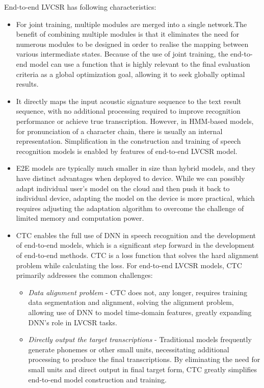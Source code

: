 End-to-end LVCSR has following characteristics\cite{backstrom_introduction_2022}:
\begin{itemize}
    \item For joint training, multiple modules are merged into a single network.The benefit of combining multiple modules is that it eliminates the need for numerous modules to be designed in order to realise the mapping between various intermediate states. Because of the use of joint training, the end-to-end model can use a function that is highly relevant to the final evaluation criteria as a global optimization goal, allowing it to seek globally optimal results.
    \item It directly maps the input acoustic signature sequence to the text result sequence, with no additional processing required to improve recognition performance or achieve true transcription. However, in HMM-based models, for pronunciation of a character chain, there is usually an internal representation. Simplification in the construction and training of speech recognition models is enabled by features of end-to-end LVCSR model.
    \item E2E models are typically much smaller in size than hybrid models, and they have distinct advantages when deployed to device. While we can possibly adapt individual user's model on the cloud and then push it back to individual device, adapting the model on the device is more practical, which requires adjusting the adaptation algorithm to overcome the challenge of limited memory and computation power.
    \item CTC enables the full use of DNN in speech recognition and the development of end-to-end models, which is a significant step forward in the development of end-to-end methods. CTC is a loss function that solves the hard alignment problem while calculating the loss. For end-to-end LVCSR models, CTC primarily addresses the common challenges:
    \begin{itemize}
    \item \textit{Data alignment problem} - CTC does not, any longer, requires training data segmentation and alignment, solving the alignment problem, allowing use of DNN to model time-domain features, greatly expanding DNN's role in LVCSR tasks.
    \item \textit{Directly output the target transcriptions} - Traditional models frequently generate phonemes or other small units, necessitating additional processing to produce the final transcriptions. By eliminating the need for small units and direct output in final target form, CTC greatly simplifies end-to-end model construction and training.
    \end{itemize}
\end{itemize}

